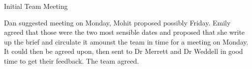 \documentclass{article}
\begin{document}
\begin{Minutes}{Initial Team Meeting}

Dan suggested meeting on Monday, Mohit proposed possibly Friday. Emily
agreed that those were the two most sensible dates and proposed that she
write up the brief and circulate it amounst the team in time for a
meeting on Monday. It could then be agreed upon, then sent to Dr Merrett
and Dr Weddell in good time to get their feedback. The team agreed.


\end{Minutes}
\end{document}
